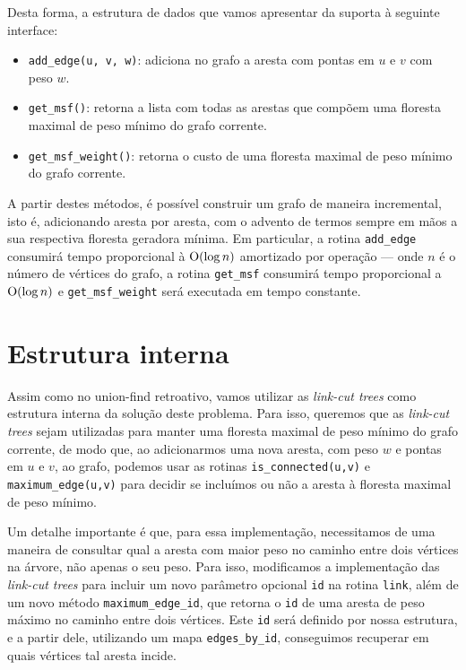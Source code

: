 Desta forma, a estrutura de dados que vamos apresentar da suporta à seguinte interface:

\begin{itemize}
    \item \texttt{add\_edge(u, v, w)}: adiciona no grafo a aresta com pontas em $u$ e $v$ com peso $w$.
    \item \texttt{get\_msf()}: retorna a lista com todas as arestas que compõem uma floresta maximal de peso mínimo do grafo corrente.
    \item \texttt{get\_msf\_weight()}: retorna o custo de uma floresta maximal de peso mínimo do grafo corrente.
\end{itemize}

A partir destes métodos, é possível construir um grafo de maneira incremental, isto é, adicionando aresta por aresta, com o advento de termos sempre em mãos a sua respectiva floresta geradora mínima. Em particular, a rotina \texttt{add\_edge} consumirá tempo proporcional à $\mathrm{O} (\log n)$ amortizado por operação --- onde $n$ é o número de vértices do grafo, a rotina \texttt{get\_msf} consumirá tempo proporcional a $\mathrm{O} (\log n)$ e \texttt{get\_msf\_weight} será executada em tempo constante.

\section{Estrutura interna}
\label{sec:imsf-est-int}

Assim como no union-find retroativo, vamos utilizar as \emph{link-cut trees} como estrutura interna da solução deste problema. Para isso, queremos que as \emph{link-cut trees} sejam utilizadas para manter uma floresta maximal de peso mínimo do grafo corrente, de modo que, ao adicionarmos uma nova aresta, com peso $w$ e pontas em $u$ e $v$, ao grafo, podemos usar as rotinas \texttt{is\_connected(u,v)} e \texttt{maximum\_edge(u,v)} para decidir se incluímos ou não a aresta à floresta maximal de peso mínimo.

Um detalhe importante é que, para essa implementação, necessitamos de uma maneira de consultar qual a aresta com maior peso no caminho entre dois vértices na árvore, não apenas o seu peso. Para isso, modificamos a implementação das \emph{link-cut trees} para incluir um novo parâmetro opcional \texttt{id} na rotina \texttt{link}, além de um novo  método \texttt{maximum\_edge\_id}, que retorna o \texttt{id} de uma aresta de peso máximo no caminho entre dois vértices. Este \texttt{id} será definido por nossa estrutura, e a partir dele, utilizando um mapa \texttt{edges\_by\_id}, conseguimos recuperar em quais vértices tal aresta incide.


